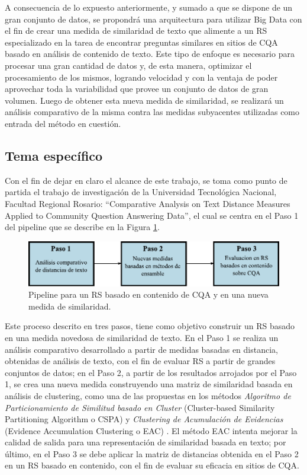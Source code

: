 \bigskip A consecuencia de lo expuesto anteriormente, y sumado a que se dispone de un gran conjunto de datos, se propondrá una arquitectura para utilizar Big Data con el fin de crear una medida de similaridad de texto que alimente a un RS especializado en la tarea de encontrar preguntas similares en sitios de CQA basado en análisis de contenido de texto. Este tipo de enfoque es necesario para procesar una gran cantidad de datos y, de esta manera, optimizar el procesamiento de los mismos, logrando velocidad y con la ventaja de poder aprovechar toda la variabilidad que provee un conjunto de datos de gran volumen. Luego de obtener esta nueva medida de similaridad, se realizará un análisis comparativo de la misma contra las medidas subyacentes utilizadas como entrada del método en cuestión.

\subsection{Tema específico}
\noindent Con el fin de dejar en claro el alcance de este trabajo, se toma como punto de partida el trabajo de investigación de la Universidad Tecnológica Nacional, Facultad Regional Rosario: “Comparative Analysis on Text Distance Measures Applied to Community Question Answering Data”, el cual se centra en el Paso 1 del pipeline que se describe en la Figura \ref{fig:pipeline}.

\begin{figure}
	\centering
	\includegraphics[width=0.9\linewidth]{5_introduccion/imagenes/pipeline}
	\caption{Pipeline para un RS basado en contenido de CQA y en una nueva medida de similaridad.}
	\label{fig:pipeline}
\end{figure}


\bigskip Este proceso descrito en tres pasos, tiene como objetivo construir un RS basado en una medida novedosa de similaridad de texto. En el Paso 1 se realiza un análisis comparativo desarrollado a partir de medidas basadas en distancia, obtenidas de análisis de texto, con el fin de evaluar RS a partir de grandes conjuntos de datos; en el Paso 2, a partir de los resultados arrojados por el Paso 1, se crea una nueva medida construyendo una matriz de similaridad basada en análisis de clustering, como una de las propuestas en los métodos \textit{Algoritmo de Particionamiento de Similitud basado en Cluster} (Cluster-based Similarity Partitioning Algorithm o CSPA) \citep{strehl33knowledge} y \textit{Clustering de Acumulación de Evidencias} (Evidence Accumulation Clustering o EAC) \citep{fred2005combining}. El método EAC intenta mejorar la calidad de salida para una representación de similaridad basada en texto; por último, en el Paso 3 se debe aplicar la matriz de distancias obtenida en el Paso 2 en un RS basado en contenido, con el fin de evaluar su eficacia en sitios de CQA.

